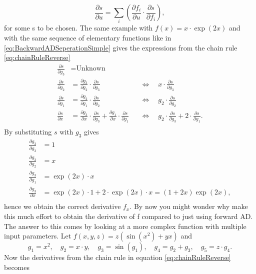 \begin{equation}
    \label{eq:chainRuleReverse}
    \frac{\partial s}{\partial u} = \sum_i\left(\frac{\partial f_i}{\partial u}\cdot\frac{\partial s}{\partial f_i}\right),
\end{equation}
for some s to be chosen. The same example with $f(x) = x\cdot\exp(2x)$ and with the same sequence of elementary functions like in \eqref{eq:BackwardADSeperationSimple} gives the expressions from the chain rule \eqref{eq:chainRuleReverse}
\begin{align*}
    \frac{\partial s}{\partial g_3} &= \text{Unknown}\\
    \frac{\partial s}{\partial g_2} &= \frac{\partial g_3}{\partial g_2} \cdot \frac{\partial s}{\partial g_3} &&\Longleftrightarrow \quad x\cdot \frac{\partial s}{\partial g_3} \\
    \frac{\partial s}{\partial g_1} &= \frac{\partial g_2}{\partial g_1}\cdot \frac{\partial s}{\partial g_2} &&\Longleftrightarrow \quad g_2 \cdot \frac{\partial s}{\partial g_2} \\
    \frac{\partial s}{\partial x} &= \frac{\partial g_3}{\partial x}\cdot \frac{\partial s}{\partial g_3} + \frac{\partial g_1}{\partial x}\cdot \frac{\partial s}{\partial g_1} && \Longleftrightarrow \quad g_2\cdot \frac{\partial s}{\partial g_3} + 2\cdot \frac{\partial s}{\partial g_1}.\\
\end{align*}
By substituting $s$ with $g_3$ gives
\begin{align*}
    \frac{\partial g_3}{\partial g_3} &= 1\\
    \frac{\partial g_3}{\partial g_2} &= x\\
    \frac{\partial g_3}{\partial g_1} &= \exp(2x)\cdot x\\
    \frac{\partial g_3}{\partial x} &= \exp(2x)\cdot 1 + 2\cdot\exp(2x)\cdot x = (1 + 2x)\exp(2x),\\
\end{align*}
hence we obtain the correct derivative $f_x$. By now you might wonder why make this much effort to obtain the derivative of f compared to just using forward AD. The answer to this comes by looking at a more complex function with multiple input parameters. Let $f(x,y,z) = z(\sin(x^2)+yx)$ and 
\begin{equation*}
    g_1 = x^2, \quad g_2 = x\cdot y, \quad g_3 = \sin(g_1), \quad g_4 = g_2 + g_3, \quad g_5 = z\cdot g_4.
\end{equation*}
Now the derivatives from the chain rule in equation \eqref{eq:chainRuleReverse} becomes \\
